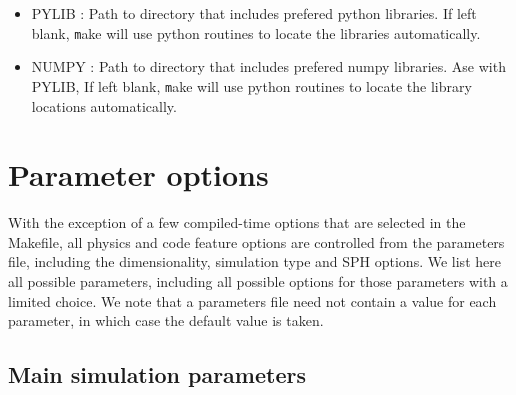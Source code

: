 \documentclass[a4paper]{article}
\newcommand{\var}[1]{\texttt{#1}}
\begin{document}
\begin{itemize}
\item PYLIB : Path to directory that includes prefered python libraries.  If left blank, {\var make} will use python routines to locate the libraries automatically.

\item NUMPY : Path to directory that includes prefered numpy libraries.  Ase with PYLIB, If left blank, {\var make} will use python routines to locate the library locations automatically.

\end{itemize}

\newpage



\section{Parameter options}

\noindent With the exception of a few compiled-time options that are selected in the Makefile, all physics and code feature options are controlled from the parameters file, including the dimensionality, simulation type and SPH options.  We list here all possible parameters, including all possible options for those parameters with a limited choice.  We note that a parameters file need not contain a value for each parameter, in which case the default value is taken.


\subsection{Main simulation parameters}
\end{document}

